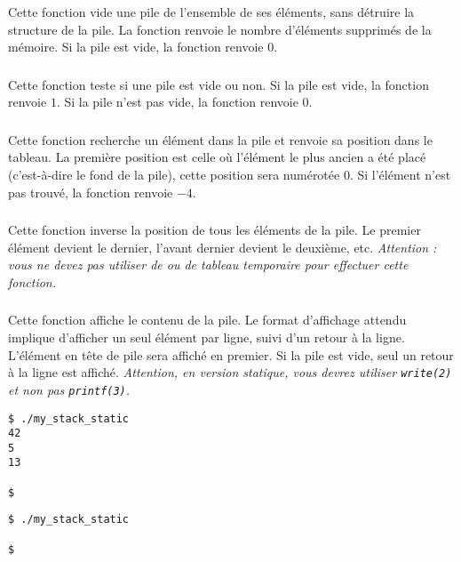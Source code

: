 \noindent Cette fonction vide une pile de l'ensemble de ses éléments, sans détruire la structure de la pile.
La fonction renvoie le nombre d'éléments supprimés de la mémoire.
Si la pile est vide, la fonction renvoie $ 0 $.


\subsubsection*{}

\noindent Cette fonction teste si une pile est vide ou non.
Si la pile est vide, la fonction renvoie $ 1 $.
Si la pile n'est pas vide, la fonction renvoie $ 0 $.


\subsubsection*{}

\noindent Cette fonction recherche un élément dans la pile et renvoie sa position dans le tableau.
La première position est celle où l'élément le plus ancien a été placé (c'est-à-dire le fond de la pile), cette position sera numérotée $ 0 $.
Si l'élément n'est pas trouvé, la fonction renvoie $ -4 $.


\subsubsection*{}

\noindent Cette fonction inverse la position de tous les éléments de la pile.
Le premier élément devient le dernier, l'avant dernier devient le deuxième, etc.
\textit{Attention : vous ne devez pas utiliser de  ou de tableau temporaire pour effectuer cette fonction.}

\subsubsection*{}

\noindent Cette fonction affiche le contenu de la pile.
Le format d'affichage attendu implique d'afficher un seul élément par ligne, suivi d'un retour à la ligne.
L'élément en tête de pile sera affiché en premier.
Si la pile est vide, seul un retour à la ligne est affiché.
\textit{Attention, en version statique, vous devrez utiliser \texttt{write(2)} et non pas \texttt{printf(3)}.}

\bigskip

\lstset{language=sh}
\begin{lstlisting}[frame=single,title={Exemple d'affichage du cas normal : pile contenant 42, 5, 13}]
$ ./my_stack_static
42
5
13

$
\end{lstlisting}

\bigskip

\lstset{language=sh}
\begin{lstlisting}[frame=single,title={Exemple d'affichage d'une pile vide}]
$ ./my_stack_static

$
\end{lstlisting}
